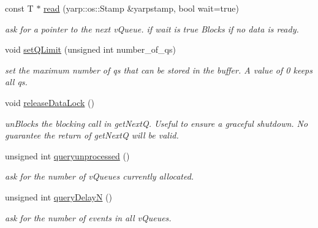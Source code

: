 \begin{DoxyCompactItemize}
const T $\ast$ \hyperlink{classev_1_1vReadPort_a2c6aabe520b140ff5c6bc5f8231cadd5}{read} (yarp\+::os\+::\+Stamp \&yarpstamp, bool wait=true)
\begin{DoxyCompactList}\small\item\em ask for a pointer to the next v\+Queue. if wait is true Blocks if no data is ready. \end{DoxyCompactList}\item 
\mbox{\label{classev_1_1vReadPort_a1f8d56c7a4ec77f622c448c46c65afd8}} 
void \hyperlink{classev_1_1vReadPort_a1f8d56c7a4ec77f622c448c46c65afd8}{set\+Q\+Limit} (unsigned int number\+\_\+of\+\_\+qs)
\begin{DoxyCompactList}\small\item\em set the maximum number of qs that can be stored in the buffer. A value of 0 keeps all qs. \end{DoxyCompactList}\item 
\mbox{\label{classev_1_1vReadPort_ab451342e9bc479c3db4a937ce41f7795}} 
void \hyperlink{classev_1_1vReadPort_ab451342e9bc479c3db4a937ce41f7795}{release\+Data\+Lock} ()
\begin{DoxyCompactList}\small\item\em un\+Blocks the blocking call in get\+NextQ. Useful to ensure a graceful shutdown. No guarantee the return of get\+NextQ will be valid. \end{DoxyCompactList}\item 
\mbox{\label{classev_1_1vReadPort_a43a2b8ca3db8938e8200072de2957ef8}} 
unsigned int \hyperlink{classev_1_1vReadPort_a43a2b8ca3db8938e8200072de2957ef8}{queryunprocessed} ()
\begin{DoxyCompactList}\small\item\em ask for the number of v\+Queues currently allocated. \end{DoxyCompactList}\item 
\mbox{\label{classev_1_1vReadPort_a61466cf1cfcd794c5735c8bcc43dd8b5}} 
unsigned int \hyperlink{classev_1_1vReadPort_a61466cf1cfcd794c5735c8bcc43dd8b5}{query\+DelayN} ()
\begin{DoxyCompactList}\small\item\em ask for the number of events in all v\+Queues. \end{DoxyCompactList}\item 

\end{DoxyCompactItemize}
